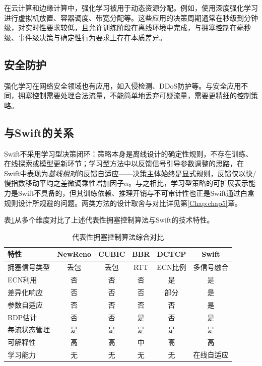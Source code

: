 在云计算和边缘计算中，强化学习被用于动态资源分配。例如，使用深度强化学习进行虚拟机放置、容器调度、带宽分配等。这些应用的决策周期通常在秒级到分钟级，对实时性要求较低，且允许训练阶段在离线环境中完成，与拥塞控制在毫秒级、事件级决策与确定性行为要求上存在本质差异。

\subsection{安全防护}

强化学习在网络安全领域也有应用，如入侵检测、DDoS防护等。与安全应用不同，拥塞控制需要处理合法流量，不能简单地丢弃可疑流量，需要更精细的控制策略。

\subsection{与Swift的关系}

Swift不采用学习型决策闭环：策略本身是离线设计的确定性规则，不存在训练、在线探索或模型更新环节；学习型方法中以反馈信号引导参数调整的思路，在Swift中表现为\emph{基线相对}的反馈自适应——决策主体始终是显式规则，反馈仅以快/慢指数移动平均之差微调乘性增加因子$\alpha$。与之相比，学习型策略的可扩展表示能力是Swift不具备的，但其训练依赖、推理开销与不可审计性也正是Swift通过白盒规则设计所规避的问题。两类方法的设计取舍与对比详见第\ref{Chap:chap5}章。

表\ref{tab:cc_comparison_summary}从多个维度对比了上述代表性拥塞控制算法与Swift的技术特性。

\begin{table}[htbp]
\centering
\caption{代表性拥塞控制算法综合对比}
\label{tab:cc_comparison_summary}
\begin{tabular}{|l|c|c|c|c|c|}
\hline
\textbf{特性} & \textbf{NewReno} & \textbf{CUBIC} & \textbf{BBR} & \textbf{DCTCP} & \textbf{Swift} \\
\hline
拥塞信号类型 & 丢包 & 丢包 & RTT & ECN比例 & 多信号融合 \\
ECN利用 & 否 & 否 & 否 & 是 & 是 \\
差异化响应 & 否 & 否 & 否 & 部分 & 是 \\
参数自适应 & 否 & 否 & 否 & 否 & 是 \\
BDP估计 & 否 & 否 & 是 & 否 & 是 \\
每流状态管理 & 是 & 是 & 是 & 是 & 是 \\
可解释性 & 高 & 高 & 中 & 高 & 高 \\
学习能力 & 无 & 无 & 无 & 无 & 在线自适应 \\
\hline
\end{tabular}
\end{table}

